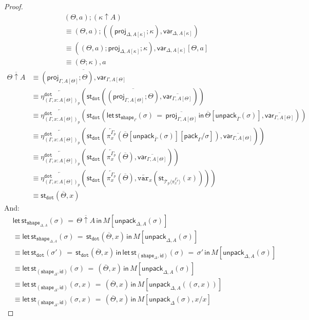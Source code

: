 \documentclass[10pt]{article}
\theoremstyle{definition}
\newcommand{\id}{\mathsf{id}}
\newcommand{\rewrite}[2]{\overleftarrow{#1}(#2)}
\newcommand\StI[2]{\ensuremath{\mathsf{st}_{#1}(#2)}}
\newcommand\StE[4]{\ensuremath{\mathsf{let} \, \StI{#1}{#3} \, = \, {#2} \, \mathsf{in} \, #4}}
\newcommand\ApEl[2]{\mathcal{T}_{#1}\langle#2\rangle}
\newcommand\pack[1]{\ensuremath{\mathsf{pack}_{#1}}}
\newcommand\unpack[2]{\ensuremath{\mathsf{unpack}_{#1}(#2)}}
\newcommand{\modeof}[1]{{#1}_p}
\newcommand{\tdot}{\ensuremath{\mathtt{dot}}}
\newcommand{\tshape}[1]{\ensuremath{\mathtt{shape}_{#1}}}
\newcommand{\upstairs}[1]{\overline{#1}}
\newcommand\proj[1]{\ensuremath{\mathsf{proj}_{#1}}}
\newcommand\qvar[1]{\ensuremath{\mathsf{var}_{#1}}}
\newcommand\var[1]{\ensuremath{\mathtt{var}_{#1}}}
\begin{document}
\begin{proof}
\begin{align*}
&(\Theta, a);(\kappa \uparrow A) \\
&\equiv (\Theta,a);((\proj{\Delta, A[\kappa]}; \kappa) , \qvar{\Delta, A[\kappa]}) \\
&\equiv ((\Theta, a);\proj{\Delta, A[\kappa]}; \kappa) , \qvar{\Delta, A[\kappa]}[\Theta,a] \\
&\equiv (\Theta;\kappa) , a
\end{align*}
\begin{align*}
\upstairs{\Theta \uparrow A} 
&\equiv \upstairs{(\proj{\Gamma, A[\Theta]}; \Theta) , \qvar{\Gamma, A[\Theta]}} \\
&\equiv \rewrite{\eta^\tdot_{\modeof{(\Gamma, x : A[\Theta])}}}{\StI{\tdot}{\upstairs{(\proj{\Gamma, A[\Theta]}; \Theta)}, \upstairs{\qvar{\Gamma,A[\Theta]}}}} \\
&\equiv \rewrite{\eta^\tdot_{\modeof{(\Gamma, x : A[\Theta])}}}{\StI{\tdot}{\StE{\tshape{\Gamma}}{\upstairs{\proj{\Gamma, A[\Theta]}}}{\sigma}{\upstairs{\Theta}[\unpack{\upstairs{\Gamma}}{\sigma}]}, \upstairs{\qvar{\Gamma,A[\Theta]}}}} \\
&\equiv \rewrite{\eta^\tdot_{\modeof{(\Gamma, x : A[\Theta])}}}{\StI{\tdot}{\rewrite{\pi^{\modeof{\Gamma}}_x}{\upstairs{\Theta}[\unpack{\upstairs{\Gamma}}{\sigma}][\pack{\Gamma}/\sigma]}, \upstairs{\qvar{\Gamma,A[\Theta]}}}} \\
&\equiv \rewrite{\eta^\tdot_{\modeof{(\Gamma, x : A[\Theta])}}}{\StI{\tdot}{\rewrite{\pi^{\modeof{\Gamma}}_x}{\upstairs{\Theta}}, \upstairs{\qvar{\Gamma,A[\Theta]}}}} \\
&\equiv \rewrite{\eta^\tdot_{\modeof{(\Gamma, x : A[\Theta])}}}{\StI{\tdot}{\rewrite{\pi^{\modeof{\Gamma}}_x}{\upstairs{\Theta}},  \rewrite{\var{x}}{\StI{\ApEl{p}{\pi^{\modeof{\Gamma}}_x}}{x}}}} \\
&\equiv \StI{\tdot}{\upstairs{\Theta}, x}
\end{align*}
And:
\begin{align*}
&\StE{\tshape{\Delta, A}}{\upstairs{\Theta \uparrow A}}{\sigma}{M[\unpack{\Delta, A}{\sigma}]} \\
&\equiv \StE{\tshape{\Delta, A}}{\StI{\tdot}{\upstairs{\Theta}, x}}{\sigma}{M[\unpack{\Delta, A}{\sigma}]} \\
&\equiv \StE{\tdot}{\StI{\tdot}{\upstairs{\Theta}, x}}{\sigma'}{\StE{(\tshape{\Delta}, \id)}{\sigma'}{\sigma}{M[\unpack{\Delta, A}{\sigma}]}} \\
&\equiv \StE{(\tshape{\Delta}, \id)}{(\upstairs{\Theta}, x)}{\sigma}{M[\unpack{\Delta, A}{\sigma}]} \\
&\equiv \StE{(\tshape{\Delta}, \id)}{(\upstairs{\Theta}, x)}{\sigma, x}{M[\unpack{\Delta, A}{(\sigma, x)}]} \\
&\equiv \StE{(\tshape{\Delta}, \id)}{(\upstairs{\Theta}, x)}{\sigma, x}{M[\unpack{\Delta}{\sigma}, x/x]}
\end{align*}
\end{proof}
\end{document}
